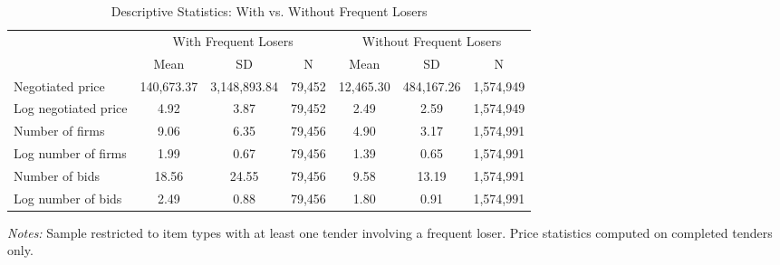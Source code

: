 \begin{table}[htbp]
\centering
\caption{Descriptive Statistics: With vs. Without Frequent Losers}
\label{tab:descstats}
\begin{adjustbox}{max width=\textwidth}
\begin{threeparttable}
\small
\begin{tabular}{lcccccc}
\toprule
 & \multicolumn{3}{c}{With Frequent Losers} & \multicolumn{3}{c}{Without Frequent Losers} \\
\cmidrule(lr){2-4} \cmidrule(lr){5-7}
 & Mean & SD & N & Mean & SD & N \\
\midrule
Negotiated price & 140,673.37 & 3,148,893.84 & 79,452 & 12,465.30 & 484,167.26 & 1,574,949 \\
Log negotiated price & 4.92 & 3.87 & 79,452 & 2.49 & 2.59 & 1,574,949 \\
Number of firms & 9.06 & 6.35 & 79,456 & 4.90 & 3.17 & 1,574,991 \\
Log number of firms & 1.99 & 0.67 & 79,456 & 1.39 & 0.65 & 1,574,991 \\
Number of bids & 18.56 & 24.55 & 79,456 & 9.58 & 13.19 & 1,574,991 \\
Log number of bids & 2.49 & 0.88 & 79,456 & 1.80 & 0.91 & 1,574,991 \\
\bottomrule
\end{tabular}
\begin{tablenotes}
\small
\item \textit{Notes:} Sample restricted to item types with at least one tender
involving a frequent loser. Price statistics computed on completed tenders only.
\end{tablenotes}
\end{threeparttable}
\end{adjustbox}
\end{table}
